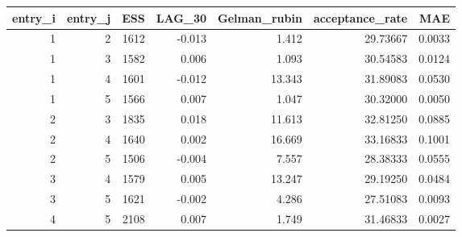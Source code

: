 \begin{longtable}{rrrrrrr}
\toprule
entry\_i & entry\_j & ESS & LAG\_30 & Gelman\_rubin & acceptance\_rate & MAE \\ 
\midrule
1 & 2 & 1612 & -0.013 & 1.412 & 29.73667 & 0.0033 \\ 
1 & 3 & 1582 & 0.006 & 1.093 & 30.54583 & 0.0124 \\ 
1 & 4 & 1601 & -0.012 & 13.343 & 31.89083 & 0.0530 \\ 
1 & 5 & 1566 & 0.007 & 1.047 & 30.32000 & 0.0050 \\ 
2 & 3 & 1835 & 0.018 & 11.613 & 32.81250 & 0.0885 \\ 
2 & 4 & 1640 & 0.002 & 16.669 & 33.16833 & 0.1001 \\ 
2 & 5 & 1506 & -0.004 & 7.557 & 28.38333 & 0.0555 \\ 
3 & 4 & 1579 & 0.005 & 13.247 & 29.19250 & 0.0484 \\ 
3 & 5 & 1621 & -0.002 & 4.286 & 27.51083 & 0.0093 \\ 
4 & 5 & 2108 & 0.007 & 1.749 & 31.46833 & 0.0027 \\ 
\bottomrule
\end{longtable}


